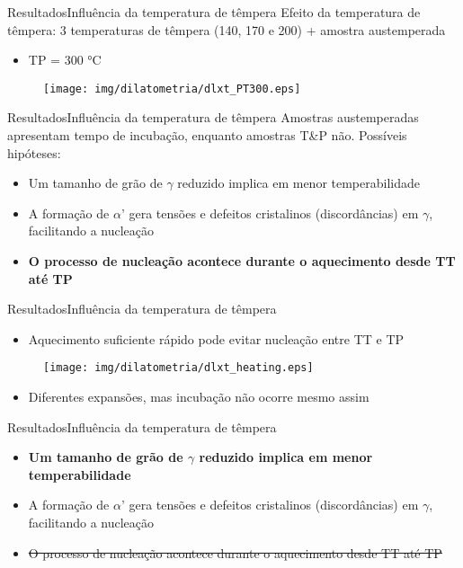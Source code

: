 
\begin{frame}{Resultados}{Influência da temperatura de têmpera}
	Efeito da temperatura de têmpera: 3 temperaturas de têmpera (140, 170 e 200) + amostra austemperada
	\begin{itemize}
		\item TP = 300 °C
	\end{itemize}
	
	\begin{figure}
		\centering
		\texttt{[image: img/dilatometria/dlxt\_PT300.eps]}
	\end{figure}
\end{frame}

\begin{frame}{Resultados}{Influência da temperatura de têmpera}
	Amostras austemperadas apresentam tempo de incubação, enquanto amostras T\&P não. Possíveis hipóteses:
	\begin{itemize}
		\item Um tamanho de grão de $\gamma$ reduzido implica em menor temperabilidade
		\item A formação de $\alpha\text{'}$ gera tensões e defeitos cristalinos (discordâncias) em $\gamma$, facilitando a nucleação
		\item \textbf<2>{O processo de nucleação acontece durante o aquecimento desde TT até TP}
	\end{itemize}
\end{frame}

\begin{frame}{Resultados}{Influência da temperatura de têmpera}
	\begin{itemize}
		\item Aquecimento suficiente rápido pode evitar nucleação entre TT e TP
	\end{itemize}

	\begin{figure}
		\centering
		\texttt{[image: img/dilatometria/dlxt\_heating.eps]}
	\end{figure}

	\begin{itemize}
		\item Diferentes expansões, mas incubação não ocorre mesmo assim
	\end{itemize}
\end{frame}

\begin{frame}{Resultados}{Influência da temperatura de têmpera}
	\begin{itemize}
		\item \textbf<2>{Um tamanho de grão de $\gamma$ reduzido implica em menor temperabilidade}
		\item A formação de $\alpha\text{'}$ gera tensões e defeitos cristalinos (discordâncias) em $\gamma$, facilitando a nucleação
		\item \sout{O processo de nucleação acontece durante o aquecimento desde TT até TP}
	\end{itemize}
\end{frame}

